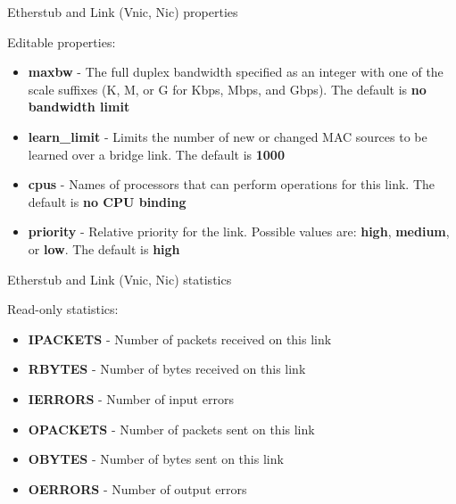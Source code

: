 \documentclass{beamer}
\begin{document}
		\begin{frame}{Etherstub and Link (Vnic, Nic) properties }

			Editable properties:
			
			\begin{itemize}

				\item \textbf{maxbw} - The full duplex bandwidth specified as an integer with one of the scale suffixes (K, M, or G for Kbps, Mbps, and Gbps). The default is \textbf{no bandwidth limit}
				\item \textbf{learn\_limit} - Limits the number of new or changed MAC sources to be learned over a bridge link. The default is \textbf{1000}
				\item \textbf{cpus} - Names of processors that can perform operations for this link. The default is \textbf{no CPU binding}
				\item \textbf{priority} - Relative priority for the link. Possible values are: \textbf{high}, \textbf{medium}, or \textbf{low}. The default is \textbf{high}
			
			\end{itemize}

		\end{frame}

		\begin{frame}{Etherstub and Link (Vnic, Nic) statistics }

			Read-only statistics:
			
			\begin{itemize}

				\item \textbf{IPACKETS} - Number of packets received on this link
				\item \textbf{RBYTES} - Number of bytes received on this link
				\item \textbf{IERRORS} - Number of input errors
				\item \textbf{OPACKETS} - Number of packets sent on this link
				\item \textbf{OBYTES} - Number of bytes sent on this link
				\item \textbf{OERRORS} - Number of output errors
			
			\end{itemize}

		\end{frame}
\end{document}
